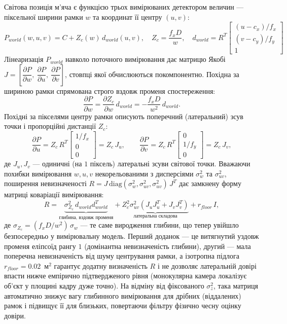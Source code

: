 Світова позиція м'яча є функцією трьох вимірюваних детектором величин ---
піксельної ширини рамки $w$ та координат її центру $(u, v)$:
\begin{equation}P_{world}(w, u, v) = C + Z_c(w)\, d_{world}(u, v),\quad
Z_c = \frac{f_x D}{w},\quad
d_{world} = R^{T}\begin{bmatrix} (u - c_x)/f_x \\ (v - c_y)/f_y \\ 1 \end{bmatrix}\end{equation}
Лінеаризація $P_{world}$ навколо поточного вимірювання дає матрицю Якобі
$J = \left[\dfrac{\partial P}{\partial w},\ \dfrac{\partial P}{\partial u},\ \dfrac{\partial P}{\partial v}\right]$,
стовпці якої обчислюються покомпонентно. Похідна за шириною рамки спрямована
строго вздовж променя спостереження:
\begin{equation}\frac{\partial P}{\partial w} = \frac{\partial Z_c}{\partial w}\, d_{world}
= -\frac{f_x D}{w^2}\, d_{world}.\end{equation}
Похідні за пікселями центру рамки описують поперечний (латеральний) зсув точки і
пропорційні дистанції $Z_c$:
\begin{equation}\frac{\partial P}{\partial u} = Z_c\, R^{T}\begin{bmatrix} 1/f_x \\ 0 \\ 0 \end{bmatrix} = Z_c\, J_u,\qquad
\frac{\partial P}{\partial v} = Z_c\, R^{T}\begin{bmatrix} 0 \\ 1/f_y \\ 0 \end{bmatrix} = Z_c\, J_v,\end{equation}
де $J_u, J_v$ --- одиничні (на $1$ піксель) латеральні зсуви світової точки.
Вважаючи похибки вимірювання $w, u, v$ некорельованими з дисперсіями
$\sigma_w^2$ та $\sigma_{uv}^2$, поширення невизначеності
$R = J\,\mathrm{diag}(\sigma_w^2, \sigma_{uv}^2, \sigma_{uv}^2)\,J^{T}$ дає
замкнену форму матриці коваріації вимірювання:
\begin{equation}R = \underbrace{\sigma_{Z_c}^2\, d_{world} d_{world}^{T}}_{\text{глибина, вздовж променя}}
+ \underbrace{Z_c^2 \sigma_{uv}^2 \left(J_u J_u^{T} + J_v J_v^{T}\right)}_{\text{латеральна складова}}
+ r_{floor}\, I,\end{equation}
де $\sigma_{Z_c} = (f_x D / w^2)\,\sigma_w$ --- те саме виродження глибини, що
тепер увійшло безпосередньо у вимірювальну модель. Перший доданок --- це
витягнутий уздовж променя еліпсоїд рангу $1$ (домінантна невизначеність глибини),
другий --- мала поперечна невизначеність від шуму центрування рамки, а ізотропна
підлога $r_{floor} = 0.02$~м$^2$ гарантує додатну визначеність $R$ і не дозволяє
латеральній довірі впасти нижче емпірично підтвердженого рівня (монокулярна
камера локалізує об'єкт у площині кадру дуже точно). На відміну від фіксованого
$\sigma_z^2$, така матриця автоматично знижує вагу глибинного вимірювання для
дрібних (віддалених) рамок і підвищує її для близьких, повертаючи фільтру фізично
чесну оцінку довіри.

